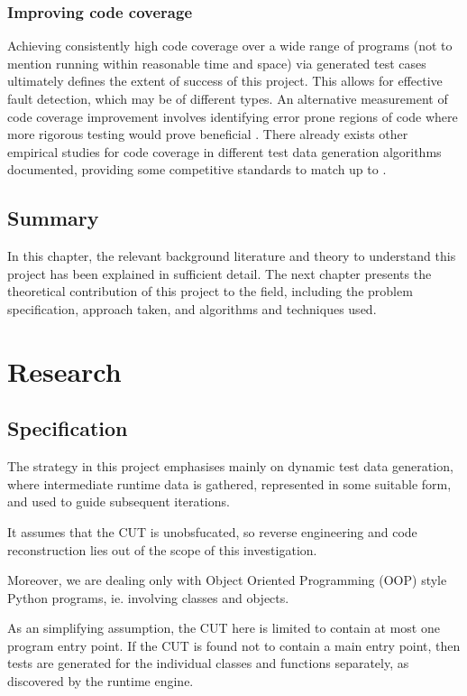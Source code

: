 \documentclass{icldt}
\numberwithin{equation}{section}       %
\begin{document}
\subsection{Improving code coverage}
Achieving consistently high code coverage over a wide range of programs (not to mention running within reasonable time and space) via generated test cases ultimately defines the extent of success of this project. This allows for effective fault detection, which may be of different types. An alternative measurement of code coverage improvement involves identifying error prone regions of code where more rigorous testing would prove beneficial \cite{Ntafos1988} \cite{InceDC1987}. There already exists other empirical studies for code coverage in different test data generation algorithms documented, providing some competitive standards to match up to \cite{Han2008} \cite{Rothermel99testcase} \cite{Lakhotia2009}.
\section{Summary}
In this chapter, the relevant background literature and theory to understand this project has been explained in sufficient detail. The next chapter presents the theoretical contribution of this project to the field, including the problem specification, approach taken, and algorithms and techniques used.
\chapter{Research}
\label{ch:research}
\section{Specification}
The strategy in this project emphasises mainly on dynamic test data generation, where intermediate runtime data is gathered, represented in some suitable form, and used to guide subsequent iterations.

It assumes that the CUT is unobsfucated, so reverse engineering and code reconstruction lies out of the scope of this investigation.

Moreover, we are dealing only with Object Oriented Programming (OOP) style Python programs, ie. involving classes and objects.

As an simplifying assumption, the CUT here is limited to contain at most one program entry point. If the CUT is found not to contain a main entry point, then tests are generated for the individual classes and functions separately, as discovered by the runtime engine.
\end{document}
